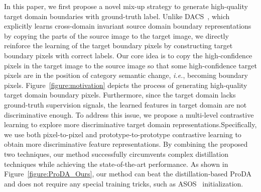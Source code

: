 \documentclass[sigconf]{acmart}
\begin{document}
		
		
		In this paper, we first propose a novel mix-up strategy to generate high-quality target domain boundaries with ground-truth label.
		Unlike DACS~\cite{tranheden2021dacs}, which explicitly learns cross-domain invariant source domain boundary representations by copying the parts of the source image to the target image, we directly reinforce the learning of the target boundary pixels by constructing target boundary pixels with correct labels.
		Our core idea is to copy the high-confidence pixels in the target image to the source image so that some high-confidence target pixels are in the position of category semantic change, \textit{i.e.}, becoming boundary pixels. Figure~\ref{figure:motivation} depicts the process of generating high-quality target domain boundary pixels. Furthermore, since the target domain lacks ground-truth supervision signals, the learned features in target domain are not discriminative enough. To address this issue, we propose a multi-level contrastive learning to explore more discriminative target domain representations.Specifically, we use both pixel-to-pixel and prototype-to-prototype contrastive learning to obtain more discriminative feature representations. By combining the proposed two techniques, our method successfully circumvents complex distillation techniques while achieving the state-of-the-art performance. As shown in Figure~\ref{figure:ProDA_Ours}, 
		our method can beat the distillation-based ProDA and does not require any special training tricks, such as ASOS~\cite{tsai2018learning} initialization.
		
\end{document}
